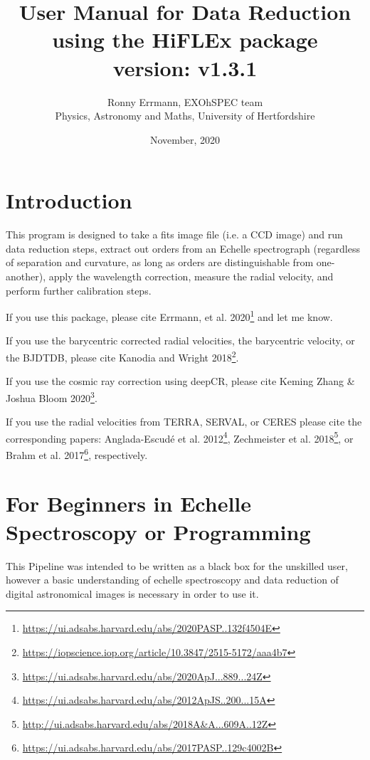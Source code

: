 \documentclass[10pt,a4paper]{article}
\title{User Manual for Data Reduction using the HiFLEx package\\ version: v1.3.1}
\date{November, 2020}
\author{Ronny Errmann, EXOhSPEC team\\ Physics, Astronomy and Maths, University of Hertfordshire}
\begin{document}
\maketitle

\tableofcontents
{}


\newpage


\section{Introduction}
\label{intro}

This program is designed to take a fits image file (i.e. a CCD image) and run data reduction steps, extract out orders from an Echelle spectrograph (regardless of separation and curvature, as long as orders are distinguishable from one-another), apply the wavelength correction, measure the radial velocity, and perform further calibration steps.

If you use this package, please cite Errmann, et al. 2020\footnote{\url{https://ui.adsabs.harvard.edu/abs/2020PASP..132f4504E}} and let me know.

If you use the barycentric corrected radial velocities, the barycentric velocity, or the BJDTDB, please cite Kanodia and Wright 2018\footnote{\url{https://iopscience.iop.org/article/10.3847/2515-5172/aaa4b7}}.

If you use the cosmic ray correction using deepCR, please cite Keming Zhang \& Joshua Bloom 2020\footnote{\url{https://ui.adsabs.harvard.edu/abs/2020ApJ...889...24Z}}.

If you use the radial velocities from TERRA, SERVAL, or CERES please cite the corresponding papers: Anglada-Escud{\'e} et al. 2012\footnote{\url{https://ui.adsabs.harvard.edu/abs/2012ApJS..200...15A}}, Zechmeister et al. 2018\footnote{\url{http://ui.adsabs.harvard.edu/abs/2018A&A...609A..12Z}}, or 
Brahm et al. 2017\footnote{\url{https://ui.adsabs.harvard.edu/abs/2017PASP..129c4002B}}, respectively.


\section{For Beginners in Echelle Spectroscopy or Programming}

This Pipeline was intended to be written as a black box for the unskilled user, however a basic understanding of echelle spectroscopy and data reduction of digital astronomical images is necessary in order to use it.
\end{document}
